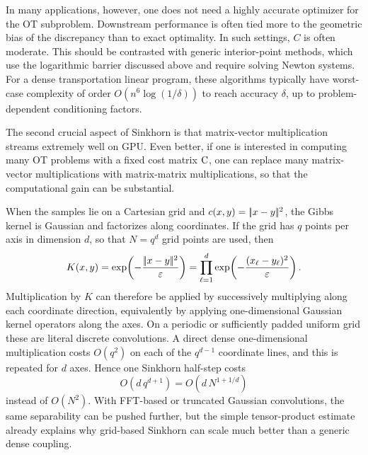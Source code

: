 In many applications, however, one does not need a highly accurate optimizer for the OT subproblem. Downstream performance is often tied more to the geometric bias of the discrepancy than to exact optimality. In such settings, $C$ is often moderate.
%
This should be contrasted with generic interior-point methods, which use the logarithmic barrier discussed above and require solving Newton systems. For a dense transportation linear program, these algorithms typically have worst-case complexity of order $O(n^6 \log(1/\delta))$ to reach accuracy $\delta$, up to problem-dependent conditioning factors.

The second crucial aspect of Sinkhorn is that matrix-vector multiplication streams extremely well on GPU. Even better, if one is interested in computing many OT problems with a fixed cost matrix $\mathrm{C}$, one can replace many matrix-vector multiplications with matrix-matrix multiplications, so that the computational gain can be substantial.

\begin{rem}\label{rem-sinkhorn-separable-gaussian}
	When the samples lie on a Cartesian grid and $c(x,y)=|\!| x-y |\!|^2$, the Gibbs kernel is Gaussian and factorizes along coordinates. If the grid has $q$ points per axis in dimension $d$, so that $N=q^d$ grid points are used, then
	\[
		K(x,y)=\exp\!\left(-\frac{|\!| x-y |\!|^2}{\varepsilon}\right)
		=
		\prod_{\ell=1}^d
		\exp\!\left(-\frac{(x_\ell-y_\ell)^2}{\varepsilon}\right).
	\]
	Multiplication by $K$ can therefore be applied by successively multiplying along each coordinate direction, equivalently by applying one-dimensional Gaussian kernel operators along the axes. On a periodic or sufficiently padded uniform grid these are literal discrete convolutions. A direct dense one-dimensional multiplication costs $O(q^2)$ on each of the $q^{d-1}$ coordinate lines, and this is repeated for $d$ axes. Hence one Sinkhorn half-step costs
	\begin{equation}\label{eq-separable-gaussian-half-step}
		O(d\,q^{d+1})=O(d\,N^{1+1/d})
	\end{equation}
	instead of $O(N^2)$. With FFT-based or truncated Gaussian convolutions, the same separability can be pushed further, but the simple tensor-product estimate already explains why grid-based Sinkhorn can scale much better than a generic dense coupling.
\end{rem}



